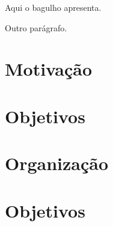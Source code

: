 
Aqui o bagulho apresenta. \cite{parrot}

Outro parágrafo.\cite{tcc-andre}

\section{Motivação}
\section{Objetivos}
\section{Organização}
\section{Objetivos}
